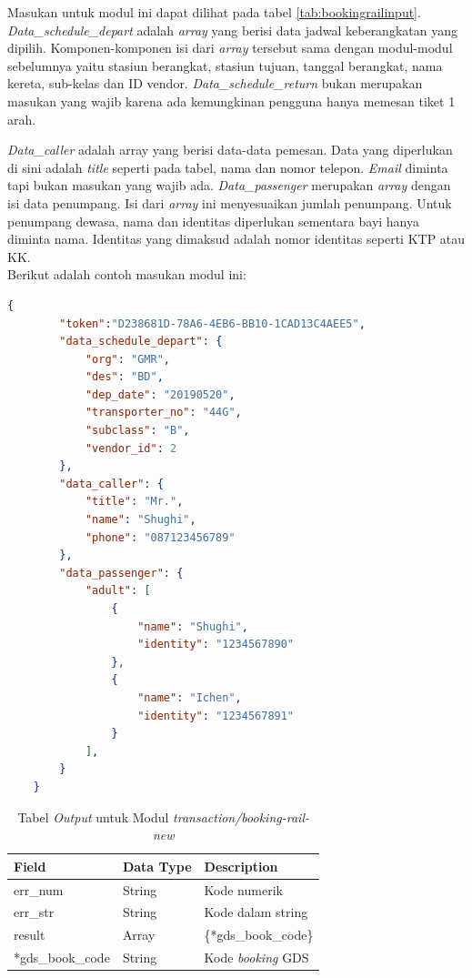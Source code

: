 Masukan untuk modul ini dapat dilihat pada tabel \ref{tab:bookingrailinput}. \textit{Data\_schedule\_depart} adalah \textit{array} yang berisi data jadwal keberangkatan yang dipilih. Komponen-komponen isi dari \textit{array} tersebut sama dengan modul-modul sebelumnya yaitu stasiun berangkat, stasiun tujuan, tanggal berangkat, nama kereta, sub-kelas dan ID vendor. \textit{Data\_schedule\_return} bukan merupakan masukan yang wajib karena ada kemungkinan pengguna hanya memesan tiket 1 arah.

\textit{Data\_caller} adalah array yang berisi data-data pemesan. Data yang diperlukan di sini adalah \textit{title} seperti pada tabel, nama dan nomor telepon. \textit{Email} diminta tapi bukan masukan yang wajib ada. \textit{Data\_passenger} merupakan \textit{array} dengan isi data penumpang. Isi dari \textit{array} ini menyesuaikan jumlah penumpang. Untuk penumpang dewasa, nama dan identitas diperlukan sementara bayi hanya diminta nama. Identitas yang dimaksud adalah nomor identitas seperti KTP atau KK.\\

Berikut adalah contoh masukan modul ini:

\begin{lstlisting}[language=json]
    {
        "token":"D238681D-78A6-4EB6-BB10-1CAD13C4AEE5",
        "data_schedule_depart": {
            "org": "GMR",
            "des": "BD",
            "dep_date": "20190520",
            "transporter_no": "44G",
            "subclass": "B",
            "vendor_id": 2
        },
        "data_caller": {
            "title": "Mr.",
            "name": "Shughi",
            "phone": "087123456789"
        },
        "data_passenger": {
            "adult": [
                {
                    "name": "Shughi",
                    "identity": "1234567890"
                },
                {
                    "name": "Ichen",
                    "identity": "1234567891"
                }
            ],
        }
    }
\end{lstlisting}

\begin{table}[H]
	\centering 
	\caption{Tabel \textit{Output} untuk Modul \textit{transaction/booking-rail-new}}
	\label{tab:bookingrailoutput}
	\begin{tabular}{|l|l|p{8cm}|}
		\hline
		Field & Data Type & Description\\
		\hline

		\hline
        err\_num & String & Kode numerik\\
        \hline
        err\_str & String & Kode dalam string\\
        \hline
        result & Array & \{*gds\_book\_code\}\\
        \hline
        \hline
        *gds\_book\_code & String & Kode \textit{booking} GDS\\
        \hline
		
	\end{tabular} 
\end{table}

